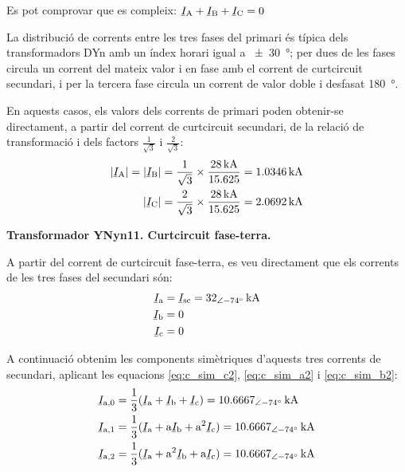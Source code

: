 \begin{exemple}[\CCasimSecTrafo{}]
    Es pot comprovar que es compleix: $\cmplx{I}\ped{A} + \cmplx{I}\ped{B} + \cmplx{I}\ped{C} = 0$

    La distribució de corrents entre les tres fases del primari és típica dels transformadors DYn amb un índex horari igual a \qty{+-30}{\degree}; per dues de les fases circula un corrent del mateix valor i en fase amb el corrent de curtcircuit secundari, i per la tercera fase circula un corrent de valor doble i desfasat \qty{180}{\degree}.

    En aquests casos, els valors dels corrents de primari poden obtenir-se directament, a partir del corrent de curtcircuit secundari, de la relació de transformació i dels factors $\frac{1}{\sqrt{3}}$ i  $\frac{2}{\sqrt{3}}$:
    \begin{align*}
        |\cmplx{I}\ped{A}| = |\cmplx{I}\ped{B}| = \frac{1}{\sqrt{3}} \times \frac{\qty{28}{kA}}{\num{15,625}} = \qty{1,0346}{kA} \\
        |\cmplx{I}\ped{C}|= \frac{2}{\sqrt{3}} \times \frac{\qty{28}{kA}}{\num{15,625}} = \qty{2,0692}{kA}
    \end{align*}

    \break
    \textbf{ Transformador YNyn11. Curtcircuit fase-terra.}

    \begin{center}
       
    \end{center}

    A partir del corrent de curtcircuit fase-terra, es veu directament que els corrents de les tres fases del secundari són:
    \begin{align*}
        \cmplx{I}\ped{a} &= \cmplx{I}\ped{sc} = \qtypd{32}{-74}{kA} \\
        \cmplx{I}\ped{b} &= 0  \\
        \cmplx{I}\ped{c} &= 0
    \end{align*}

    A continuació obtenim les components simètriques d'aquests tres corrents de secundari, aplicant les equacions \eqref{eq:c_sim_c2}, \eqref{eq:c_sim_a2} i \eqref{eq:c_sim_b2}:
    \begin{align*}
        \cmplx{I}\ped{a,0} &= \frac{1}{3} (\cmplx{I}\ped{a} + \cmplx{I}\ped{b} +
        \cmplx{I}\ped{c}) = \qtypd{10,6667}{-74}{kA} \\
        \cmplx{I}\ped{a,1} &= \frac{1}{3} (\cmplx{I}\ped{a} + \au \cmplx{I}\ped{b} +
         \au^2 \cmplx{I}\ped{c}) = \qtypd{10,6667}{-74}{kA}  \\
        \cmplx{I}\ped{a,2} &= \frac{1}{3} (\cmplx{I}\ped{a} + \au^2 \cmplx{I}\ped{b} +
         \au \cmplx{I}\ped{c}) = \qtypd{10,6667}{-74}{kA}
    \end{align*}


\end{exemple}
